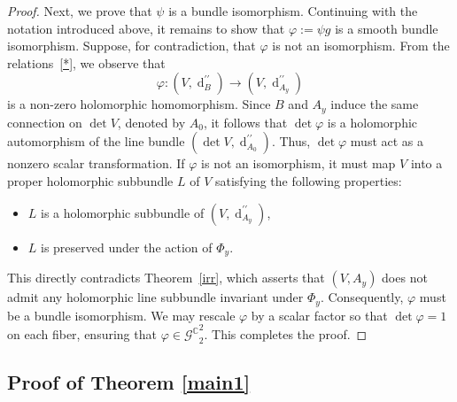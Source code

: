 \documentclass[a4paper]{amsart}
\theoremstyle{definition}
\theoremstyle{remark}
\numberwithin{equation}{section}
\begin{document}
\begin{proof}
Next, we prove that $\psi$ is a bundle isomorphism. Continuing with the notation introduced above, it remains to show that $\varphi := \psi g$ is a smooth bundle isomorphism. Suppose, for contradiction, that $\varphi$ is not an isomorphism. From the relations~\eqref{*}, we observe that  
\[
\varphi \colon (V, \operatorname{d}_B^{\prime\prime}) \to (V, \operatorname{d}_{A_y}^{\prime\prime})
\]
is a non-zero holomorphic homomorphism. Since $B$ and $A_y$ induce the same connection on $\det V$, denoted by $A_0$, it follows that $\det \varphi$ is a holomorphic automorphism of the line bundle $(\det V, \operatorname{d}_{A_0}^{\prime\prime})$. Thus, $\det \varphi$ must act as a nonzero scalar transformation. If $\varphi$ is not an isomorphism, it must map $V$ into a proper holomorphic subbundle $L$ of $V$ satisfying the following properties:
\begin{itemize}
    \item $L$ is a holomorphic subbundle of $(V, \operatorname{d}_{A_y}^{\prime\prime})$,
    \item $L$ is preserved under the action of $\Phi_y$.
\end{itemize}
This directly contradicts Theorem~\ref{irr}, which asserts that $(V, A_y)$ does not admit any holomorphic line subbundle invariant under $\Phi_y$. Consequently, $\varphi$ must be a bundle isomorphism. We may rescale $\varphi$ by a scalar factor so that $\det \varphi = 1$ on each fiber, ensuring that $\varphi \in {\mathscr{G}^\mathbb{C}}_2^2$. This completes the proof.
\end{proof}

\subsection{Proof of Theorem \ref{main1}}
\end{document}
